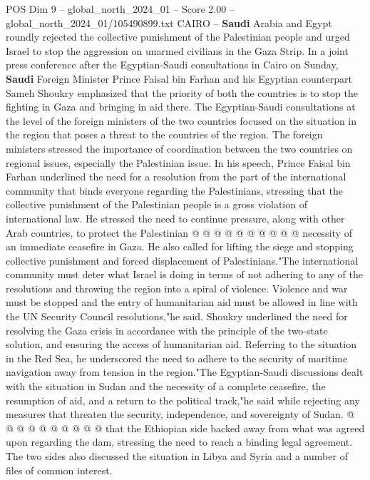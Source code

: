 \begin{textsample}{POS Dim 9 – global\_north\_2024\_01 – Score 2.00 – global\_north\_2024\_01/105490899.txt}  \label{ex:f9_pos_248}
CAIRO -- \textbf{Saudi} Arabia and Egypt roundly rejected the collective punishment of the Palestinian people and urged Israel to stop the aggression on unarmed civilians in the Gaza Strip.
In a joint press conference after the Egyptian-Saudi consultations in Cairo on Sunday, \textbf{Saudi} Foreign Minister Prince Faisal bin Farhan and his Egyptian counterpart Sameh Shoukry emphasized that the priority of both the countries is to stop the fighting in Gaza and bringing in aid there.
The Egyptian-Saudi consultations at the level of the foreign ministers of the two countries focused on the situation in the region that poses a threat to the countries of the region.
The foreign ministers stressed the importance of coordination between the two countries on regional issues, especially the Palestinian issue.
In his speech, Prince Faisal bin Farhan underlined the need for a resolution from the part of the international community that binds everyone regarding the Palestinians, stressing that the collective punishment of the Palestinian people is a gross violation of international law.
He stressed the need to continue pressure, along with other Arab countries, to protect the Palestinian @ @ @ @ @ @ @ @ @ @ necessity of an immediate ceasefire in Gaza.
He also called for lifting the siege and stopping collective punishment and forced displacement of Palestinians."The international community must deter what Israel is doing in terms of not adhering to any of the resolutions and throwing the region into a spiral of violence.
Violence and war must be stopped and the entry of humanitarian aid must be allowed in line with the UN Security Council resolutions,"he said.
Shoukry underlined the need for resolving the Gaza crisis in accordance with the principle of the two-state solution, and ensuring the access of humanitarian aid.
Referring to the situation in the Red Sea, he underscored the need to adhere to the security of maritime navigation away from tension in the region."The Egyptian-Saudi discussions dealt with the situation in Sudan and the necessity of a complete ceasefire, the resumption of aid, and a return to the political track,"he said while rejecting any measures that threaten the security, independence, and sovereignty of Sudan. @ @ @ @ @ @ @ @ @ @ that the Ethiopian side backed away from what was agreed upon regarding the dam, stressing the need to reach a binding legal agreement.
The two sides also discussed the situation in Libya and Syria and a number of files of common interest.

\end{textsample}
